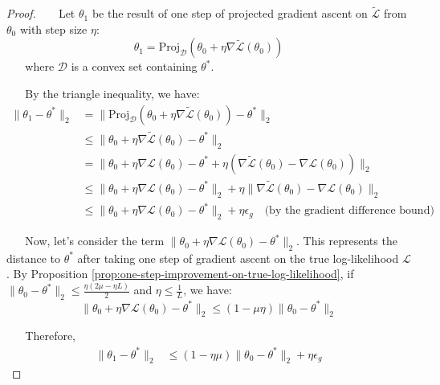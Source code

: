\begin{proof}
    Let $\theta_1$ be the result of one step of projected gradient ascent on $\tilde{\mathcal{L}}$ from $\theta_0$ with step size $\eta$:
    $$
    \theta_1 = \text{Proj}_{\mathcal{D}} (\theta_0 + \eta \nabla \tilde{\mathcal{L}}(\theta_0))
    $$
    where $\mathcal{D}$ is a convex set containing $\theta^*$.

    By the triangle inequality, we have:
    \begin{align*}
    \| \theta_1 - \theta^* \|_2 &= \| \text{Proj}_{\mathcal{D}} (\theta_0 + \eta \nabla \tilde{\mathcal{L}}(\theta_0)) - \theta^* \|_2 \\
    &\leq \| \theta_0 + \eta \nabla \tilde{\mathcal{L}}(\theta_0) - \theta^* \|_2 \\
    &= \| \theta_0 + \eta \nabla \mathcal{L}(\theta_0) - \theta^* + \eta (\nabla \tilde{\mathcal{L}}(\theta_0) - \nabla \mathcal{L}(\theta_0)) \|_2 \\
    &\leq \| \theta_0 + \eta \nabla \mathcal{L}(\theta_0) - \theta^* \|_2 + \eta \| \nabla \tilde{\mathcal{L}}(\theta_0) - \nabla \mathcal{L}(\theta_0) \|_2 \\
    &\leq \| \theta_0 + \eta \nabla \mathcal{L}(\theta_0) - \theta^* \|_2 + \eta \epsilon_g \quad \text{(by the gradient difference bound)}
    \end{align*}

    Now, let's consider the term $\| \theta_0 + \eta \nabla \mathcal{L}(\theta_0) - \theta^* \|_2$. This represents the distance to $\theta^*$ after taking one step of gradient ascent on the true log-likelihood $\mathcal{L}$. By Proposition \ref{prop:one-step-improvement-on-true-log-likelihood}, if $\| \theta_0 - \theta^* \|_2 \leq \frac{\eta(2\mu - \eta L)}{2}$ and $\eta \leq \frac{1}{L}$, we have:
    $$
    \| \theta_0 + \eta \nabla \mathcal{L}(\theta_0) - \theta^* \|_2 \leq (1 - \mu \eta) \| \theta_0 - \theta^* \|_2
    $$

    Therefore,
\begin{align*}
    \| \theta_1 - \theta^* \|_2 &\leq (1-\eta\mu)\|\theta_0-\theta^*\|_2+\eta\epsilon_g
\end{align*}
\end{proof}


